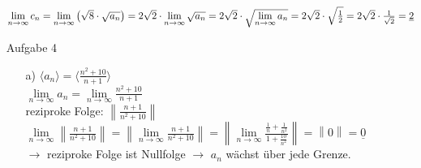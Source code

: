 \documentclass{scrreprt}
\begin{document}
\begin{enumerate}
{\begin{enumerate}
{                    $\lim \limits_{n \to \infty} c_n =
                    \lim \limits_{n \to \infty} \left( \sqrt{8} \cdot \sqrt{a_n}\right) =\\
                    2\sqrt{2} \cdot \lim \limits_{n \to \infty} \sqrt{a_n} =
                    2\sqrt{2} \cdot \sqrt{ \lim \limits_{n \to \infty} a_n } =\\
                    2\sqrt{2} \cdot \sqrt{\frac{1}{2}} =
                    2\sqrt{2} \cdot \frac{1}{\sqrt{2}} =
                    \underline{2}$\\
                }
            \end{enumerate}
        }
        \item[Aufgabe 4]{
            \begin{enumerate}
                \item [a)]{
                    $\langle a_n \rangle = \langle \frac{n^2 + 10}{n+1} \rangle$\\
                    $\lim \limits_{n \to \infty} a_n =
                    \lim \limits_{n \to \infty} \frac{n^2 + 10}{n+1}$\\
                    reziproke Folge: $\left\| \frac{n+1}{n^2 +10} \right\|$\\
                    $\lim \limits_{n \to \infty} \left\| \frac{n+1}{n^2 +10} \right\| =
                    \left\| \lim \limits_{n \to \infty} \frac{n+1}{n^2 +10} \right\| =
                    \left\| \lim \limits_{n \to \infty} \frac{\frac{1}{n}+\frac{1}{n^2}}{1 + \frac{10}{n^2}} \right\| =
                    \left\| 0 \right\| =
                    \underline{0}$\\
                    $\rightarrow$ reziproke Folge ist Nullfolge $\rightarrow$ $a_n$ wächst über jede Grenze.
                }
            \end{enumerate}
        }
    \end{enumerate}
\end{document}

